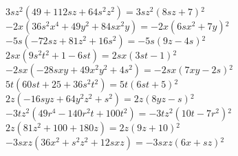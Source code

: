 \documentclass[a4paper,12pt]{report}
\begin{document}
\begin{core}\phantom{ }

\begin{tasks}
\task ${{3 s z^2}}\mathopen{}\left(49  + 112 s z + 64 s^2 z^2\right)\mathclose{}={{3 s z^2\mathopen{}\left(8 s z+7 \right)\mathclose{}^2}}$
\task ${{-2 x}}\mathopen{}\left(36 s^2 x^4 + 49 y^2 + 84 s x^2 y\right)\mathclose{}={{-2 x\mathopen{}\left(6 s x^2+7 y\right)\mathclose{}^2}}$
\task ${{-5 s}}\mathopen{}\left(-72 s z + 81 z^2 + 16 s^2\right)\mathclose{}={{-5 s\mathopen{}\left(9 z-4 s\right)\mathclose{}^2}}$
\task ${{2 s x}}\mathopen{}\left(9 s^2 t^2 + 1-6 s t\right)\mathclose{}={{2 s x\mathopen{}\left(3 s t-1\right)\mathclose{}^2}}$
\task ${{-2 s x}}\mathopen{}\left(-28 s x y + 49 x^2 y^2 + 4 s^2\right)\mathclose{}={{-2 s x\mathopen{}\left(7 x y-2 s\right)\mathclose{}^2}}$
\task ${{5 t}}\mathopen{}\left(60 s t + 25  + 36 s^2 t^2\right)\mathclose{}={{5 t\mathopen{}\left(6 s t+5 \right)\mathclose{}^2}}$
\task ${{2 z}}\mathopen{}\left(-16 s y z + 64 y^2 z^2 + s^2\right)\mathclose{}={{2 z\mathopen{}\left(8 y z-s\right)\mathclose{}^2}}$
\task ${{-3 t z^2}}\mathopen{}\left(49 r^4-140 r^2 t + 100 t^2\right)\mathclose{}={{-3 t z^2\mathopen{}\left(10 t-7 r^2\right)\mathclose{}^2}}$
\task ${{2 z}}\mathopen{}\left(81 z^2 + 100  + 180 z\right)\mathclose{}={{2 z\mathopen{}\left(9 z+10 \right)\mathclose{}^2}}$
\task ${{-3 s x z}}\mathopen{}\left(36 x^2 + s^2 z^2 + 12 s x z\right)\mathclose{}={{-3 s x z\mathopen{}\left(6 x+s z\right)\mathclose{}^2}}$
\end{tasks}

\end{core} 
\end{document}
